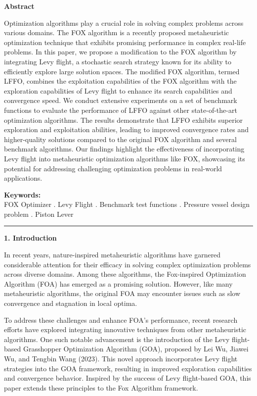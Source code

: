 \documentclass[
]{article}
\begin{document}
\begin{justify}
\textbf{Abstract}

\noindent
Optimization algorithms play a crucial role in solving complex problems across various domains. The FOX algorithm is a recently proposed metaheuristic optimization technique that exhibits promising performance in complex real-life problems. In this paper, we propose a modification to the FOX algorithm by integrating Levy flight, a stochastic search strategy known for its ability to efficiently explore large solution spaces. The modified FOX algorithm, termed LFFO, combines the exploitation capabilities of the FOX algorithm with the exploration capabilities of Levy flight to enhance its search capabilities and convergence speed. We conduct extensive experiments on a set of benchmark functions to evaluate the performance of LFFO against other state-of-the-art optimization algorithms. The results demonstrate that LFFO exhibits superior exploration and exploitation abilities, leading to improved convergence rates and higher-quality solutions compared to the original FOX algorithm and several benchmark algorithms. Our findings highlight the effectiveness of incorporating Levy flight into metaheuristic optimization algorithms like FOX, showcasing its potential for addressing challenging optimization problems in real-world applications.

\noindent
\begin{justify}
\textbf{Keywords:}\\
FOX Optimizer . Levy Flight . Benchmark test functions . Pressure vessel design problem . Piston Lever
\end{justify}

\vspace{1.5em} 
\hrule

\vspace{0.5em} 
\def\labelenumi{\arabic{enumi}.}
\item
\vspace{5mm}
  \textbf{1. Introduction}

In recent years, nature-inspired metaheuristic algorithms have garnered considerable attention for their efficacy in solving complex optimization problems across diverse domains. Among these algorithms, the Fox-inspired Optimization Algorithm (FOA) has emerged as a promising solution. However, like many metaheuristic algorithms, the original FOA may encounter issues such as slow convergence and stagnation in local optima.

To address these challenges and enhance FOA's performance, recent research efforts have explored integrating innovative techniques from other metaheuristic algorithms. One such notable advancement is the introduction of the Levy flight-based Grasshopper Optimization Algorithm (GOA), proposed by Lei Wu, Jiawei Wu, and Tengbin Wang (2023). This novel approach incorporates Levy flight strategies into the GOA framework, resulting in improved exploration capabilities and convergence behavior. Inspired by the success of Levy flight-based GOA, this paper extends these principles to the Fox Algorithm framework.


\end{justify}
\end{document}
